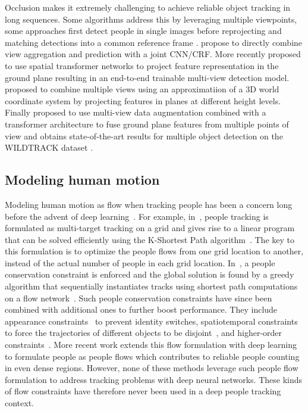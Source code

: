 \documentclass[10pt,twocolumn,letterpaper]{article}
\begin{document}
Occlusion makes it extremely challenging to achieve reliable object tracking in long sequences. Some algorithms address this by leveraging multiple viewpoints, some approaches first detect people in single images before reprojecting and matching detections into a common reference frame \cite{Xu16,Fleuret08a}. \cite{Baque17b} propose to directly combine view aggregation and prediction with a joint CNN/CRF.
More recently \cite{hou2020multiview} proposed to use spatial transformer networks \cite{Jaderberg15} to project feature representation in the ground plane resulting in an end-to-end trainable multi-view detection model. 
\cite{song2021stacked} proposed to combine multiple views using an approximatiion of a 3D world coordinate system by projecting features in planes at different height levels.
Finally \cite{hou2021multiview} proposed to use multi-view data augmentation combined with a transformer architecture to fuse ground plane features from multiple points of view and  obtains state-of-the-art results for multiple object detection  on the WILDTRACK dataset \cite{Chavdarova18a}.


\subsection{Modeling human motion}
Modeling human motion as flow when tracking people has been a concern long before the advent of deep learning~\cite{Pellegrini09,Vogel11,Butt13,Liu13,Collins12,Laptev07b,Gijsberts14,Butt12,Nater11,Milan14,Andriyenko10,Berclaz11}. For example, in~\cite{Berclaz11}, people tracking is formulated as  multi-target tracking on a grid and gives rise to a linear program that can be solved efficiently using the K-Shortest Path algorithm~\cite{Suurballe74}. The key to this formulation is to optimize the people flows from one grid location to another, instead of the actual number of people in each grid location. In~\cite{Pirsiavash11}, a people conservation constraint is enforced and the global solution is found by a greedy algorithm that sequentially instantiates tracks using shortest path computations on a flow network~\cite{Zhang08a}. Such people conservation constraints have since been combined with additional ones to further boost performance. They include appearance constraints~\cite{BenShitrit11,Dickle13,BenShitrit14} to prevent identity switches,  spatiotemporal constraints to force the trajectories of different objects to be disjoint~\cite{He16b}, and higher-order constraints~\cite{Butt13,Collins12}. 
More recent work extends this flow formulation with deep learning~\cite{Liu20a,Liu21a} to formulate people as people flows which contributes to reliable people counting in even dense regions.  However, none of these methods leverage such people flow formulation to address tracking problems with deep neural networks. These kinds of flow constraints have therefore never been used in a deep people tracking context.   
\end{document}
